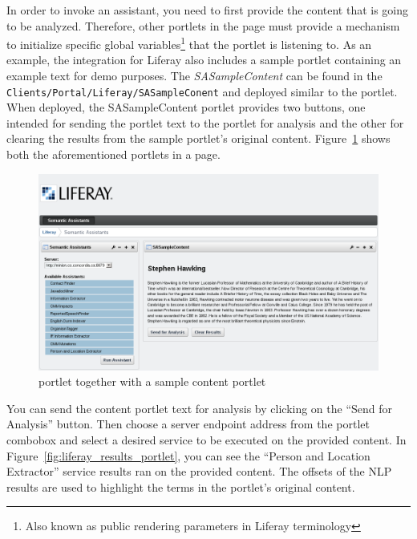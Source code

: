 \blankline

In order to invoke an assistant, you need to first provide the content that is going to be analyzed. Therefore, other portlets in the page must provide a mechanism to initialize specific global variables\footnote{Also known as public rendering parameters in Liferay terminology} that the \sa portlet is listening to. As an example, the \sa integration for Liferay also includes a sample portlet containing an example text for demo purposes. The \emph{SASampleContent} can be found in the \texttt{Clients/Portal/Liferay/SASampleConent} and deployed similar to the \sa portlet. When deployed, the SASampleContent portlet provides two buttons, one intended for sending the portlet text to the \sa portlet for analysis and the other for clearing the results from the sample portlet's original content. Figure~\ref{fig:liferay_both_portlets} shows both the aforementioned portlets in a page.

\begin{figure}
\centering
\includegraphics[scale=0.6]{pictures/liferay_both_portlets.png}
\caption{\sa portlet together with a sample content portlet}
\label{fig:liferay_both_portlets}
\end{figure}

You can send the content portlet text for analysis by clicking on the ``Send for Analysis'' button. Then choose a server endpoint address from the \sa portlet combobox and select a desired service to be executed on the provided content. In Figure~\ref{fig:liferay_results_portlet}, you can see the ``Person and Location Extractor'' service results ran on the provided content. The offsets of the NLP results are used to highlight the terms in the portlet's original content.

